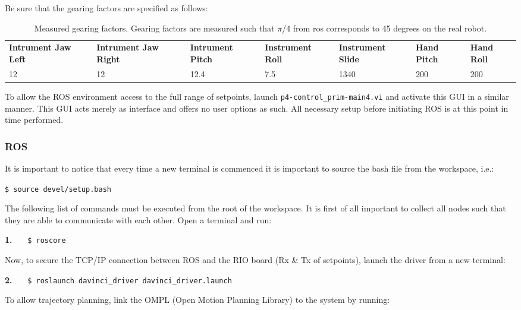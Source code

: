 Be sure that the gearing factors are specified as follows:
\begin{table}[H]
\begin{tabularx}{\textwidth}{X X X X X X X}
\rowcolor{HeaderBlue} 
\scriptsize \textbf{Intrument Jaw Left} &\scriptsize  \textbf{Intrument Jaw Right} &\scriptsize  \textbf{Intrument Pitch} &\scriptsize  \textbf{Instrument Roll} &\scriptsize  \textbf{Instrument Slide} & \scriptsize   \textbf{Hand Pitch} &  \scriptsize\textbf{Hand Roll}\\
12 & 12 & 12.4 & 7.5 & 1340 & 200 & 200\\
\end{tabularx}
	\caption{Measured gearing factors. Gearing factors are measured such that $\pi$/4 from \gls{ros} corresponds to 45 degrees on the real robot.}
\label{tab:gearing}
\end{table}
To allow the ROS environment access to the full range of setpoints, launch \texttt{p4-control\_prim-main4.vi} and activate this GUI in a similar manner. This GUI acts merely as interface and offers no user options as such. All necessary setup before initiating ROS is at this point in time performed.
\subsubsection*{ROS}
It is important to notice that every time a new terminal is commenced it is important to source the bash file from the workspace, i.e.:

\hspace{1cm} \texttt{\$ source devel/setup.bash}

The following list of commands must be executed from the root of the workspace. It is first of all important to collect all \gls{node}s such that they are able to communicate with each other. Open a terminal and run:

\hspace{1cm} \textbf{1.} \ \ \ \texttt{\$ roscore} \ \ \ {}

Now, to secure the TCP/IP connection between ROS and the RIO board (Rx \& Tx of setpoints), launch the driver from a new terminal:

\hspace{1cm} \textbf{2.} \ \ \  \texttt{\$ roslaunch davinci\_driver davinci\_driver.launch} \ \ \ {} 

To allow trajectory planning, link the OMPL (Open Motion Planning Library) to the system by running: 

